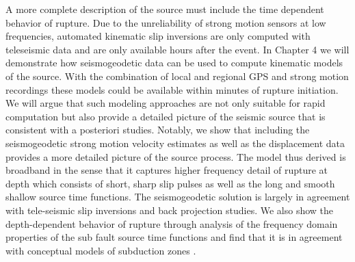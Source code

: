 A more complete description of the source must include the time dependent behavior of rupture. Due to the unreliability of strong motion sensors at low frequencies, automated kinematic slip inversions are only computed with teleseismic data \citep{ji2002} and are only available hours after the event. In Chapter 4 we will demonstrate how seismogeodetic data can be used to compute kinematic models of the source. With the combination of local and regional GPS and strong motion recordings these models could be available within minutes of rupture initiation. We will argue that such modeling approaches are not only suitable for rapid computation but also provide a detailed picture of the seismic source that is consistent with a posteriori studies. Notably, we show that including the seismogeodetic strong motion velocity estimates as well as the displacement data provides a more detailed picture of the source process. The model thus derived is broadband in the sense that it captures higher frequency detail of rupture at depth which consists of short, sharp slip pulses as well as the long and smooth shallow source time functions. The seismogeodetic solution is largely in agreement with tele-seismic slip inversions and back projection studies. We also show the depth-dependent behavior of rupture through analysis of the frequency domain properties of the sub fault source time functions and find that it is in agreement with conceptual models of subduction zones \citep{lay2012}.

